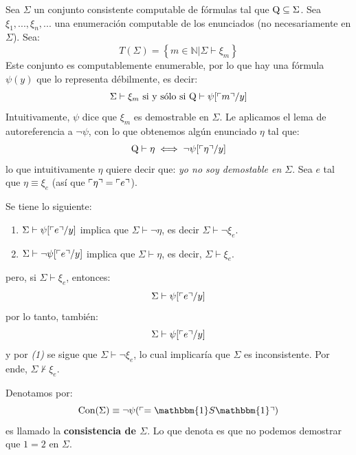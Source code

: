 \documentclass[12pt]{report}
\newcounter{it}
\theoremstyle{largebreak}
\newcommand{\bbm}[1]{\ensuremath{\mathbbm{#1}}}
\begin{document}
    Sea $\Sigma$ un conjunto consistente computable de fórmulas tal que $\textup{Q}\subseteq\Sigma$. Sea $\xi_1,...,\xi_n,...$ una enumeración computable de los enunciados (no necesariamente en $\Sigma$). Sea:
    \begin{equation*}
        T\left(\Sigma \right)=\left\{m\in\mathbb{N}\Big|\Sigma\vdash\xi_m \right\} 
    \end{equation*}
    Este conjunto es computablemente enumerable, por lo que hay una fórmula $\psi(y)$ que lo representa débilmente, es decir:
    \begin{equation*}
        \Sigma\vdash\xi_m\textup{ si y sólo si }\textup{Q}\vdash\psi[\ulcorner m\urcorner/y]
    \end{equation*}
    Intuitivamente, $\psi$ dice que $\xi_m$ es demostrable en $\Sigma$. Le aplicamos el lema de autoreferencia a $\neg\psi$, con lo que obtenemos algún enunciado $\eta$ tal que:
    \begin{equation*}
        \textup{Q}\vdash\eta\iff\neg\psi[\ulcorner\eta\urcorner/y]
    \end{equation*}
    lo que intuitivamente $\eta$ quiere decir que: \textit{yo no soy demostable en $\Sigma$}. Sea $e$ tal que $\eta\equiv\xi_e$ (así que $\ulcorner\eta\urcorner=\ulcorner e\urcorner$).

    \begin{obs}
        Se tiene lo siguiente:
        \begin{enumerate}[label = \textit{(\arabic*)}]
            \item $\Sigma\vdash\psi[\ulcorner e\urcorner/y]$ implica que $\Sigma\vdash\neg\eta$, es decir $\Sigma\vdash\neg\xi_e$.
            \item $\Sigma\vdash\neg\psi[\ulcorner e\urcorner/y]$ implica que $\Sigma\vdash\eta$, es decir, $\Sigma\vdash\xi_e$.
        \end{enumerate}
        pero, si $\Sigma\vdash\xi_e$, entonces:
        \begin{equation*}
            \Sigma\vdash\psi[\ulcorner e\urcorner/y]
        \end{equation*}
        por lo tanto, también:
        \begin{equation*}
            \Sigma\vdash\psi[\ulcorner e\urcorner/y]
        \end{equation*}
        y por \textit{(1)} se sigue que $\Sigma\vdash\neg\xi_e$, lo cual implicaría que $\Sigma$ es inconsistente. Por ende, $\Sigma\nvdash\xi_e$.
    \end{obs}

    Denotamos por:
    \begin{equation*}
        \textup{Con}(\Sigma)\equiv\neg\psi(\winecomma{=\bbm{1}S\bbm{1}})
    \end{equation*}
    es llamado la \textbf{consistencia de $\Sigma$}. Lo que denota es que no podemos demostrar que $1=2$ en $\Sigma$.
\end{document}
